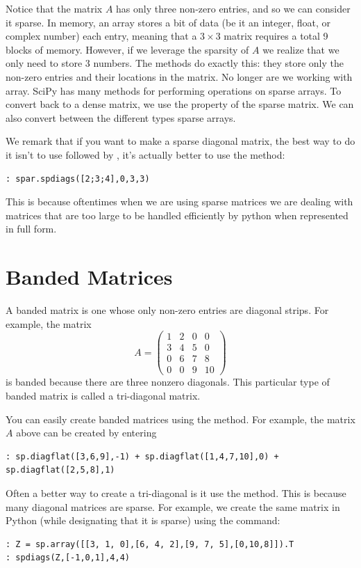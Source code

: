 Notice that the matrix $A$ has only three non-zero entries, and so we can consider it sparse. In memory, an array stores a bit of data (be it an integer, float, or complex number) each entry, meaning that a $3 \times 3$ matrix requires a total 9 blocks of memory. However, if we leverage the sparsity of $A$ we realize that we only need to store 3 numbers. The  methods do exactly this: they store only the non-zero entries and their locations in the matrix. No longer are we working with array.  SciPy has many methods for performing operations on sparse arrays.  To convert back to a dense matrix, we use the  property of the sparse matrix.  We can also convert between the different types sparse arrays.

We remark that if you want to make a sparse diagonal matrix, the
best way to do it isn't to use  followed by ,
it's actually better to use the  method:
\begin{lstlisting}[style=python]
: spar.spdiags([2;3;4],0,3,3)
\end{lstlisting}

This is because oftentimes when we are using sparse matrices we are dealing with matrices that are too large to be handled efficiently by python when represented in full form.

\section*{Banded Matrices}
A banded matrix is one whose only non-zero entries are diagonal
strips.  For example, the matrix
\[
A = \begin{pmatrix} 1&2&0&0\\3&4&5&0\\0&6&7&8\\0&0&9&10
\end{pmatrix}
\]
is banded because there are three nonzero diagonals.  This
particular type of banded matrix is called a tri-diagonal matrix.

You can easily create banded matrices using the  method.  For example, the matrix $A$ above can be created by
entering
\begin{lstlisting}[style=python]
: sp.diagflat([3,6,9],-1) + sp.diagflat([1,4,7,10],0) + sp.diagflat([2,5,8],1)
\end{lstlisting}

Often a better way to create a tri-diagonal is it use the  method. This is because many diagonal matrices are sparse. For example, we create the same matrix in Python (while designating that it is sparse) using the command:
\begin{lstlisting}[style=python]
: Z = sp.array([[3, 1, 0],[6, 4, 2],[9, 7, 5],[0,10,8]]).T
: spdiags(Z,[-1,0,1],4,4)
\end{lstlisting}

